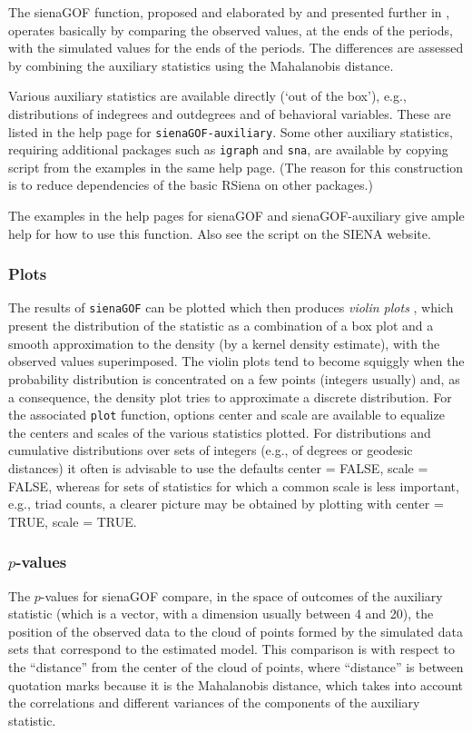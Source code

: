 \documentclass[a4paper,fleqn,11pt]{article}
\newcommand{\+}{\, + \,}
\newcommand{\sfn}[1]{\textsf{#1}}
\newcommand{\SI}{{\sf SIENA }}
\begin{document}
The \sfn{sienaGOF} function, proposed and elaborated by
\citet{Lospinoso2012} and presented further
in \citet{LospinosoSnijders2019}, operates basically by comparing
the observed values, at the ends of the periods, with the
simulated values for the ends of the periods.
The differences are assessed by combining the auxiliary statistics
using the Mahalanobis distance.

Various auxiliary statistics are available directly (`out of the box'),
e.g., distributions of indegrees and outdegrees and of behavioral
variables. These are listed in the help page for
\verb!sienaGOF-auxiliary!. Some other auxiliary statistics, requiring
additional packages such as \texttt{igraph} and \texttt{sna},
are available by copying script from the examples in the same help page.
(The reason for this construction is to reduce dependencies
of the basic \sfn{RSiena} on other packages.)

The examples in the help pages for \sfn{sienaGOF} and \sfn{sienaGOF-auxiliary}
give ample help for how to use this function.
Also see the script on the \SI website.


\subsubsection{Plots}
The results of \verb!sienaGOF! can be plotted which then produces
\emph{violin plots} \citep{HintzeNelson1998}, which present
the distribution of the statistic as a combination
of a box plot and a smooth approximation to the density
(by a kernel density estimate), with the observed values superimposed.
The violin plots tend to become squiggly when the probability distribution
is concentrated on a few points (integers usually) and, as a consequence,
the density plot tries to approximate a discrete distribution.
For the associated \verb!plot! function, options \sfn{center} and \sfn{scale}
are available to equalize the centers and scales of the various statistics
plotted.
For distributions and cumulative distributions over sets of integers
(e.g., of degrees or geodesic distances)
it often is advisable to use the defaults \sfn{center = FALSE},
\sfn{scale = FALSE}, whereas for sets of statistics for which a common scale
is less important, e.g., triad counts, a clearer picture may be obtained by
plotting with \sfn{center = TRUE}, \sfn{scale = TRUE}.

\subsubsection{$p$-values}
The $p$-values for \sfn{sienaGOF} compare, in the space of outcomes
of the auxiliary statistic (which is a vector,
with a dimension usually between 4 and 20),
the position of the observed data to the cloud of
points formed by the simulated data sets that correspond
to the estimated model. This comparison is with respect to the
``distance'' from the center of the cloud of points,
where ``distance'' is between quotation marks because it is the
Mahalanobis distance, which takes into account the correlations
and different variances of the components of the auxiliary statistic.
\end{document}
